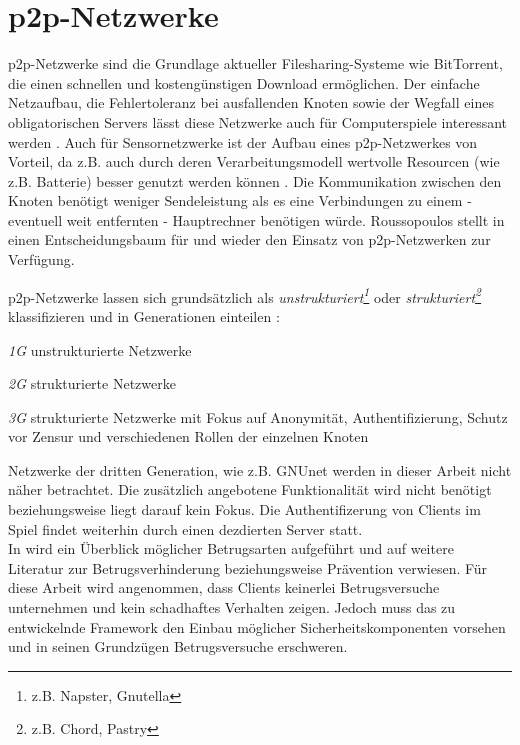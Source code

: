 \section{p2p-Netzwerke}
\label{chap:grundlagen:p2p}

p2p-Netzwerke sind die Grundlage aktueller Filesharing-Systeme wie BitTorrent, die einen schnellen und kostengünstigen Download ermöglichen. Der einfache Netzaufbau, die Fehlertoleranz bei ausfallenden Knoten sowie der Wegfall eines obligatorischen Servers lässt diese Netzwerke auch für Computerspiele interessant werden \cite{Knutsson2004Peertopeer, Triebel2008Peertopeer}. Auch für Sensornetzwerke ist der Aufbau eines p2p-Netzwerkes von Vorteil, da z.B. auch durch deren Verarbeitungsmodell wertvolle Resourcen (wie z.B. Batterie) besser genutzt werden können \cite{MuneebAliandKoenLangendoen2007Case, Sioutas2009Building}. Die Kommunikation zwischen den Knoten benötigt weniger Sendeleistung als es eine Verbindungen zu einem - eventuell weit entfernten - Hauptrechner benötigen würde. Roussopoulos stellt in \cite{Roussopoulos20032} einen Entscheidungsbaum für und wieder den Einsatz von p2p-Netzwerken zur Verfügung.


p2p-Netzwerke lassen sich grundsätzlich als \emph{unstrukturiert\footnote{z.B. Napster, Gnutella}} oder \emph{strukturiert\footnote{z.B. Chord, Pastry}} klassifizieren \cite{Steinmetz2005, Lua2005Survey} und in Generationen einteilen \cite{Bo2003PeertoPeer}:
\begin{itemize*}
	\item \emph{1G} unstrukturierte Netzwerke
	\item \emph{2G} strukturierte Netzwerke
	\item \emph{3G} strukturierte Netzwerke mit Fokus auf Anonymität, Authentifizierung, Schutz vor Zensur und verschiedenen Rollen der einzelnen Knoten
\end{itemize*}

Netzwerke der dritten Generation, wie z.B. GNUnet \cite{Bennett2002GNet} werden in dieser Arbeit nicht näher betrachtet. Die zusätzlich angebotene Funktionalität wird nicht benötigt beziehungsweise liegt darauf kein Fokus. Die Authentifizerung von Clients im Spiel findet weiterhin durch einen dezdierten Server statt.\\
In  wird ein Überblick möglicher Betrugsarten aufgeführt und auf weitere Literatur zur Betrugsverhinderung beziehungsweise Prävention verwiesen. Für diese Arbeit wird angenommen, dass Clients keinerlei Betrugsversuche unternehmen und kein schadhaftes Verhalten zeigen. Jedoch muss das zu entwickelnde Framework den Einbau möglicher Sicherheitskomponenten vorsehen und in seinen Grundzügen Betrugsversuche erschweren.

